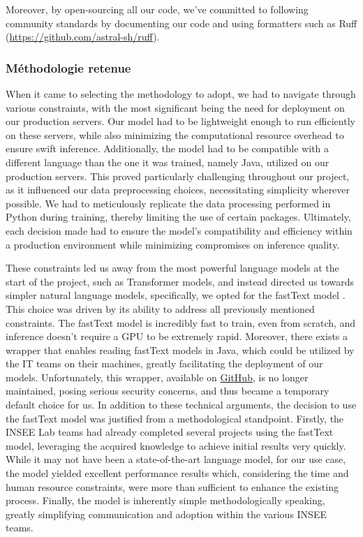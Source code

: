 Moreover, by open-sourcing all our code, we've committed to following community standards by documenting our code and using formatters such as Ruff (\url{https://github.com/astral-sh/ruff}).


\subsubsection{Méthodologie retenue}

When it came to selecting the methodology to adopt, we had to navigate through various constraints, with the most significant being the need for deployment on our production servers. Our model had to be lightweight enough to run efficiently on these servers, while also minimizing the computational resource overhead to ensure swift inference. Additionally, the model had to be compatible with a different language than the one it was trained, namely Java, utilized on our production servers. This proved particularly challenging throughout our project, as it influenced our data preprocessing choices, necessitating simplicity wherever possible. We had to meticulously replicate the data processing performed in Python during training, thereby limiting the use of certain packages. Ultimately, each decision made had to ensure the model's compatibility and efficiency within a production environment while minimizing compromises on inference quality.

These constraints led us away from the most powerful language models at the start of the project, such as Transformer models, and instead directed us towards simpler natural language models, specifically, we opted for the fastText model \cite{joulin2016bag}. This choice was driven by its ability to address all previously mentioned constraints. The fastText model is incredibly fast to train, even from scratch, and inference doesn't require a GPU to be extremely rapid. Moreover, there exists a wrapper that enables reading fastText models in Java, which could be utilized by the IT teams on their machines, greatly facilitating the deployment of our models. Unfortunately, this wrapper, available on \href{https://github.com/vinhkhuc/JFastText}{GitHub}, is no longer maintained, posing serious security concerns, and thus became a temporary default choice for us. In addition to these technical arguments, the decision to use the fastText model was justified from a methodological standpoint. Firstly, the INSEE Lab teams had already completed several projects using the fastText model, leveraging the acquired knowledge to achieve initial results very quickly. While it may not have been a state-of-the-art language model, for our use case, the model yielded excellent performance results which, considering the time and human resource constraints, were more than sufficient to enhance the existing process. Finally, the model is inherently simple methodologically speaking, greatly simplifying communication and adoption within the various INSEE teams. 


